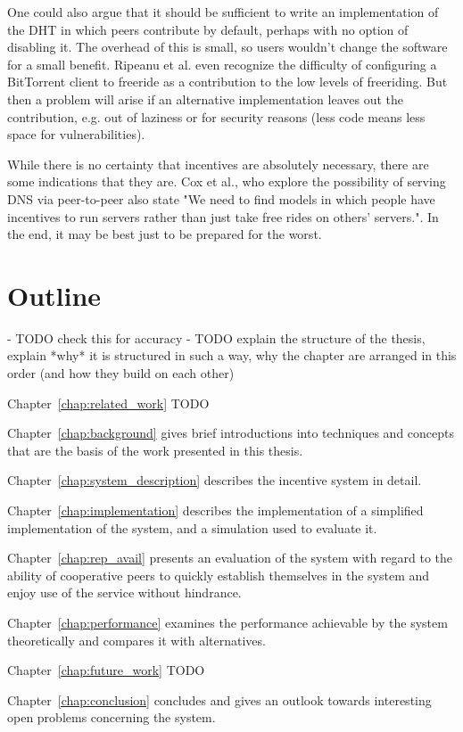 One could also argue that it should be sufficient to write an implementation of
the \ac{DHT} in which peers contribute by default, perhaps with no option of
disabling it. The overhead of this is small, so users wouldn't change the
software for a small benefit. Ripeanu et al.\cite{ripeanu2006gifting} even
recognize the difficulty of configuring a BitTorrent client to freeride as a
contribution to the low levels of freeriding. But then a problem will arise if
an alternative implementation leaves out the contribution, e.g. out of laziness
or for security reasons (less code means less space for vulnerabilities).

While there is no certainty that incentives are absolutely necessary, there are
some indications that they are. Cox et al.\cite{cox2002serving}, who explore the
possibility of serving DNS via peer-to-peer also state "We need to find models
in which people have incentives to run servers rather than just take free rides
on others’ servers.". In the end, it may be best just to be prepared for the
worst.

\section{Outline}
- TODO check this for accuracy
- TODO explain the structure of the thesis, explain *why* it is structured in
  such a way, why the chapter are arranged in this order (and how they build on
  each other)

Chapter~\ref{chap:related_work} TODO

Chapter~\ref{chap:background} gives brief introductions into techniques and
concepts that are the basis of the work presented in this thesis.

Chapter~\ref{chap:system_description} describes the incentive system in detail.

Chapter~\ref{chap:implementation} describes the implementation of a simplified
implementation of the system, and a simulation used to evaluate it.

Chapter~\ref{chap:rep_avail} presents an evaluation of the system with regard to
the ability of cooperative peers to quickly establish themselves in the system
and enjoy use of the service without hindrance.

Chapter~\ref{chap:performance} examines the performance achievable by the system
theoretically and compares it with alternatives.

Chapter~\ref{chap:future_work} TODO

Chapter~\ref{chap:conclusion} concludes and gives an outlook towards interesting
open problems concerning the system.
